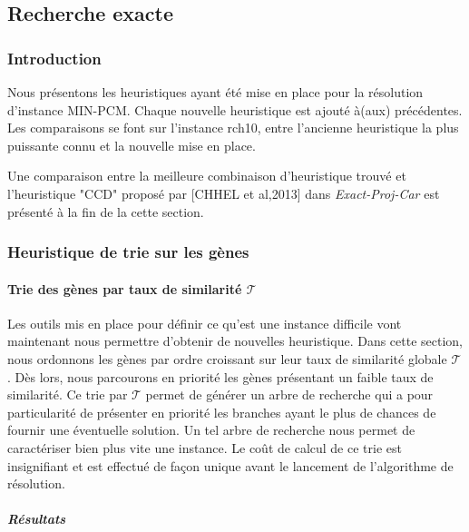 \subsection{Recherche exacte}
\subsubsection{Introduction}
Nous présentons les heuristiques ayant été mise en place pour la résolution d'instance MIN-PCM. Chaque nouvelle heuristique est ajouté à(aux) précédentes. Les comparaisons se font sur l'instance rch10, entre l'ancienne heuristique la plus puissante connu et la nouvelle mise en place. 

Une comparaison entre la meilleure combinaison d'heuristique trouvé et l'heuristique "CCD" proposé par [CHHEL et al,2013] dans \textit{Exact-Proj-Car} est présenté à la fin de la cette section.

\subsubsection{Heuristique de trie sur les gènes }
\paragraph{Trie des gènes par taux de similarité $\mathcal{T}$}
Les outils mis en place pour définir ce qu'est une instance difficile vont maintenant nous permettre d'obtenir de nouvelles heuristique. Dans cette section, nous ordonnons les gènes par ordre croissant sur leur taux de similarité globale $\mathcal{T}$. Dès lors, nous parcourons en priorité les gènes présentant un faible taux de similarité. Ce trie par $\mathcal{T}$ permet de générer un arbre de recherche qui a pour particularité de présenter en priorité les branches ayant le plus de chances de fournir une éventuelle solution. Un tel arbre de recherche nous permet de caractériser bien plus vite une instance. Le coût de calcul de ce trie est insignifiant et est effectué de façon unique avant le lancement de l'algorithme de résolution.

\subparagraph{Résultats}

%	
%	
%
%	
%	

